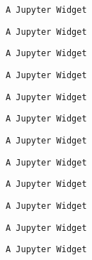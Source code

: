 \documentclass[11pt]{article}
\begin{document}
    
    
    \begin{verbatim}
A Jupyter Widget
    \end{verbatim}

    
    
    \begin{verbatim}
A Jupyter Widget
    \end{verbatim}

    
    
    \begin{verbatim}
A Jupyter Widget
    \end{verbatim}

    
    
    \begin{verbatim}
A Jupyter Widget
    \end{verbatim}

    
    
    \begin{verbatim}
A Jupyter Widget
    \end{verbatim}

    
    
    \begin{verbatim}
A Jupyter Widget
    \end{verbatim}

    
    
    \begin{verbatim}
A Jupyter Widget
    \end{verbatim}

    
    
    \begin{verbatim}
A Jupyter Widget
    \end{verbatim}

    
    
    \begin{verbatim}
A Jupyter Widget
    \end{verbatim}

    
    
    \begin{verbatim}
A Jupyter Widget
    \end{verbatim}

    
    
    \begin{verbatim}
A Jupyter Widget
    \end{verbatim}

    
    
    \begin{verbatim}
A Jupyter Widget
    \end{verbatim}
\end{document}
